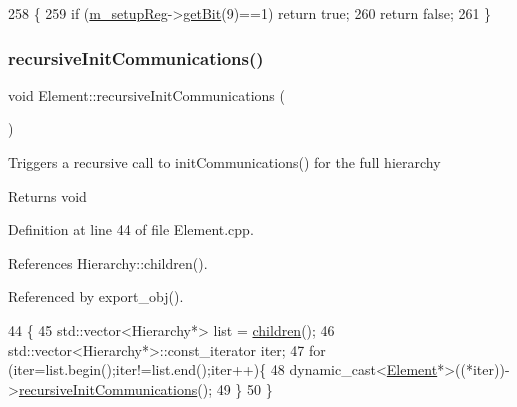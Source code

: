 \begin{DoxyCode}
258                              \{
259   \textcolor{keywordflow}{if} (\hyperlink{classA3PE_a142fa10b7e705c4701ae21678ec2ec8a}{m\_setupReg}->\hyperlink{classRegister_a5d27c9ff548817eee097ba4fdc8e8f69}{getBit}(9)==1) \textcolor{keywordflow}{return} \textcolor{keyword}{true};
260   \textcolor{keywordflow}{return} \textcolor{keyword}{false};
261 \}
\end{DoxyCode}
\mbox{\label{classElement_a82119ed37dff76508a2746a853ec35ba}} 
\subsubsection{\texorpdfstring{recursive\+Init\+Communications()}{recursiveInitCommunications()}}
{\footnotesize\ttfamily void Element\+::recursive\+Init\+Communications (\begin{DoxyParamCaption}{ }\end{DoxyParamCaption})\hspace{0.3cm}{\ttfamily [inherited]}}

Triggers a recursive call to init\+Communications() for the full hierarchy

\begin{DoxyReturn}{Returns}
void 
\end{DoxyReturn}


Definition at line 44 of file Element.\+cpp.



References Hierarchy\+::children().



Referenced by export\+\_\+obj().


\begin{DoxyCode}
44                                          \{
45   std::vector<Hierarchy*> list = \hyperlink{classHierarchy_aa9a76f69e98e052ee1a6e32cea006288}{children}();
46   std::vector<Hierarchy*>::const\_iterator iter;
47   \textcolor{keywordflow}{for} (iter=list.begin();iter!=list.end();iter++)\{
48     \textcolor{keyword}{dynamic\_cast<}\hyperlink{classElement}{Element}*\textcolor{keyword}{>}((*iter))->\hyperlink{classElement_a82119ed37dff76508a2746a853ec35ba}{recursiveInitCommunications}();
49   \}
50 \}
\end{DoxyCode}
\mbox{\label{classElement_a3c0abcb36f8906688bb7e32608df7086}} 
